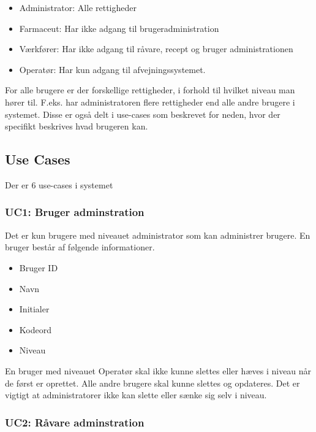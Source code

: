 \documentclass[a4paper]{article}
\begin{document}
\begin{itemize}
  \item Administrator: Alle rettigheder
  \item Farmaceut: Har ikke adgang til brugeradministration
  \item Værkfører: Har ikke adgang til råvare, recept og bruger administrationen 
  \item Operatør: Har kun adgang til afvejningssystemet. 
\end{itemize}

For alle brugere er der forskellige rettigheder, i forhold til hvilket niveau man hører til. F.eks. har administratoren flere rettigheder end alle andre brugere i systemet. Disse er også delt i use-cases som beskrevet for neden, hvor der specifikt beskrives hvad brugeren kan. 


\subsection{Use Cases} %

Der er 6 use-cases i systemet

\subsubsection{UC1: Bruger adminstration} %

Det er kun brugere med niveauet administrator som kan administrer brugere. En bruger består af følgende informationer.

\begin{itemize}
  \item Bruger ID
  \item Navn
  \item Initialer
  \item Kodeord
  \item Niveau
\end{itemize}

En bruger med niveauet Operatør skal ikke kunne slettes eller hæves i niveau når de først er oprettet.  Alle andre brugere skal kunne slettes og opdateres. Det er vigtigt at administratorer ikke kan slette eller sænke sig selv i niveau.   


\subsubsection{UC2: Råvare adminstration} %
\end{document}
